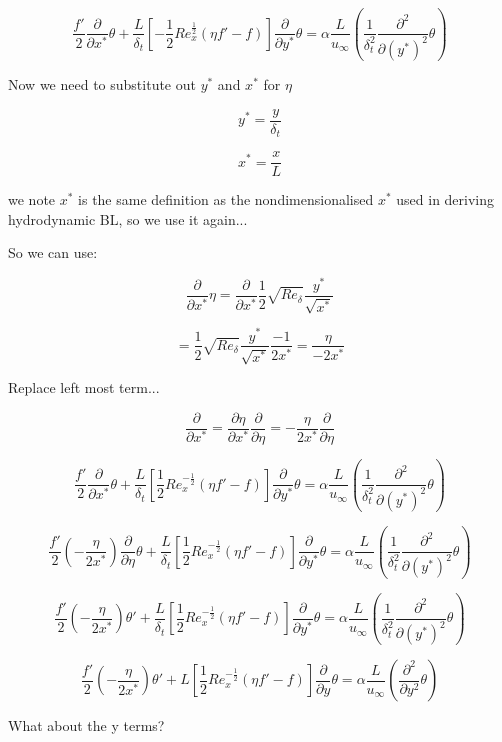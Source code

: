 \documentclass[11pt]{article}
\begin{document}
$$\frac{f'}{2} \frac{\partial}{\partial x^*} \theta + \frac{L}{ \delta_t} \left[ -\frac{1}{2}  Re_x^{\frac{1}{2}} (\eta f' -f) \right] \frac{\partial }{\partial y^*} \theta   = \alpha \frac{L}{u_\infty} (\frac{1}{\delta_t^2} \frac{\partial^2 }{\partial (y^*)^2} \theta ) $$ 

Now we need to substitute out $y^*$ and $x^*$ for $\eta$

$$y^* = \frac{y}{\delta_t}$$

$$x^* = \frac{x}{L}$$

we note $x^*$ is the same definition as the nondimensionalised $x^*$ used in deriving hydrodynamic BL, so we use it again...

So we can use:

$$ \frac{\partial}{\partial x^*} \eta =  \frac{\partial}{\partial x^*}\frac{1}{2} \sqrt{Re_\delta} \frac{y^*}{\sqrt{x^*}}  $$

$$ = \frac{1}{2} \sqrt{Re_\delta} \frac{y^*}{\sqrt{x^*}} \frac{-1}{2x^*} = \frac{\eta}{-2x^*} $$

Replace left most term...

$$\frac{\partial}{\partial x^*} = \frac{\partial \eta}{\partial x^*} \frac{\partial }{\partial \eta} = - \frac{\eta}{2x^*} \frac{\partial }{\partial \eta}  $$

$$\frac{f'}{2} \frac{\partial}{\partial x^*} \theta + \frac{L}{ \delta_t} \left[ \frac{1}{2}  Re_x^{-\frac{1}{2}} (\eta f' -f) \right] \frac{\partial }{\partial y^*} \theta   = \alpha \frac{L}{u_\infty} (\frac{1}{\delta_t^2} \frac{\partial^2 }{\partial (y^*)^2} \theta ) $$ 

$$\frac{f'}{2} ( - \frac{\eta}{2x^*}) \frac{\partial }{\partial \eta} \theta + \frac{L}{ \delta_t} \left[ \frac{1}{2}  Re_x^{-\frac{1}{2}} (\eta f' -f) \right] \frac{\partial }{\partial y^*} \theta   = \alpha \frac{L}{u_\infty} (\frac{1}{\delta_t^2} \frac{\partial^2 }{\partial (y^*)^2} \theta ) $$ 

$$\frac{f'}{2} ( - \frac{\eta}{2x^*}) \theta' + \frac{L}{ \delta_t} \left[ \frac{1}{2}  Re_x^{-\frac{1}{2}} (\eta f' -f) \right] \frac{\partial }{\partial y^*} \theta   = \alpha \frac{L}{u_\infty} (\frac{1}{\delta_t^2} \frac{\partial^2 }{\partial (y^*)^2} \theta ) $$ 

$$\frac{f'}{2} ( - \frac{\eta}{2x^*}) \theta' + L \left[ \frac{1}{2}  Re_x^{-\frac{1}{2}} (\eta f' -f) \right] \frac{\partial }{\partial y} \theta   = \alpha \frac{L}{u_\infty} ( \frac{\partial^2 }{\partial y^2} \theta ) $$ 


What about the y terms?
\end{document}
